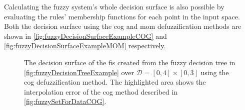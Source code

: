 Calculating the fuzzy system's whole decision surface is also possible by evaluating the rules' membership functions for each point in the input space. Both the decision surface using the \gls{cog} and \gls{mom} defuzzification methods are shown in \autoref{fig:fuzzyDecisionSurfaceExampleCOG} and \autoref{fig:fuzzyDecisionSurfaceExampleMOM} respectively.

\begin{multicols}{2}
    \begin{figure}[H]
        \centering

        \caption[Decision surface of the fuzzy rules using COG method]{The decision surface of the \gls{fis} created from the fuzzy decision tree in \autoref{fig:fuzzyDecisionTreeExample} over $\mathcal{D}=[0,4]\times[0,3]$ using the \gls{cog} defuzzification method. The highlighted area shows the interpolation error of the \gls{cog} method described in \autoref{fig:fuzzySetForDataCOG}.}
        \label{fig:fuzzyDecisionSurfaceExampleCOG}
    \end{figure}


\end{multicols}
